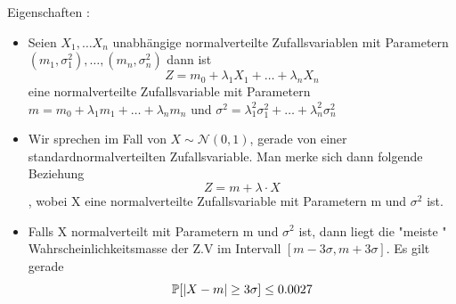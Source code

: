 Eigenschaften : \begin{itemize}
    \item Seien \(X_1, \dots X_n\) unabhängige normalverteilte Zufallsvariablen mit Parametern \((m_1, \sigma_1^2), \dots , (m_n, \sigma_n^2)\) dann ist \[ Z = m_0 + \lambda_1 X_1 + \dots + \lambda_n X_n \] eine normalverteilte Zufallsvariable mit Parametern \(m = m_0 + \lambda_1 m_1 + \dots + \lambda_n m_n\) und \(\sigma^2 = \lambda_1^2 \sigma_1^2 + \dots + \lambda_n^2 \sigma_n^2\)
    \item Wir sprechen im Fall von  \( X \sim \mathcal{N}(0,1)\), gerade von einer standardnormalverteilten Zufallsvariable. Man merke sich dann folgende Beziehung \[ Z = m + \lambda \cdot X\], wobei X eine normalverteilte Zufallsvariable mit Parametern m und \(\sigma^2\) ist.
    \item Falls X normalverteilt mit Parametern m und \( \sigma^2 \) ist, dann liegt die "meiste " Wahrscheinlichkeitsmasse der Z.V im Intervall \( [m - 3\sigma, m + 3\sigma ]\). Es gilt gerade \[ \mathbb{P}[\left\lvert X - m \right\rvert \geq 3 \sigma ] \leq 0.0027\]
\end{itemize}

